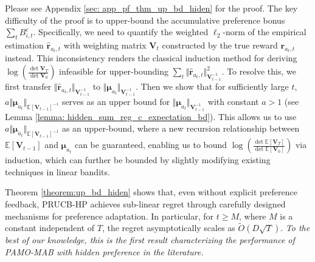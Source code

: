 Please see Appendix \ref{sec: app_pf_thm_up_bd_hiden} for the proof. The key difficulty of the proof is to upper-bound the accumulative preference bonus $\sum_{t}B_{i,t}^{c}$. Specifically, we need to quantify the weighted $\ell_2$-norm of the empirical estimation $\boldsymbol{\hat{r}}_{a_t,t}$ with weighting matrix $\boldsymbol{V}_{t}$ constructed by the true reward $\boldsymbol{r}_{a_t,t}$ instead. 
This inconsistency renders the classical induction method \cite{abbasi2011improved} for deriving $\log (\frac{\det \boldsymbol{V}_{T}}{\det \boldsymbol{V}_{0}})$ infeasible for upper-bounding $\sum_{t} \Vert \boldsymbol{\hat{r}}_{a_t,t} \Vert_{\boldsymbol{V}_{t-1}^{-1}}^2$. 
To resolve this, we first transfer $\Vert \boldsymbol{\hat{r}}_{a_t,t} \Vert_{\boldsymbol{V}_{t-1}^{-1}}$ to $\Vert \boldsymbol{\mu}_{a_t} \Vert_{\boldsymbol{V}_{t-1}^{-1}}$. Then we show that for sufficiently large $t$, $a \Vert \boldsymbol{\mu}_{a_t} \Vert_{\mathbb{E}[\boldsymbol{V}_{t-1}]^{-1}}$ serves as an upper bound for $\Vert \boldsymbol{\mu}_{a_t} \Vert_{\boldsymbol{V}_{t-1}^{-1}}$ with constant $a > 1$ (see Lemma \ref{lemma: hidden_sum_reg_c_expectation_bd}).
This allows us to use $a \Vert \boldsymbol{\mu}_{a_t} \Vert_{\mathbb{E}[\boldsymbol{V}_{t-1}]^{-1}}$ as an upper-bound, where a new recursion relationship between $\mathbb{E}[\boldsymbol{V}_{t-1}]$ and $\boldsymbol{\mu}_{a_t}$ can be guaranteed, enabling us to bound $\log (\frac{\det \mathbb{E}[\boldsymbol{V}_{T}]}{\det \mathbb{E}[\boldsymbol{V}_{0}]})$ via induction, which can further be bounded by slightly modifying existing techniques in linear bandits.

\begin{remark}
Theorem \ref{theorem:up_bd_hiden} shows that, even without explicit preference feedback, PRUCB-HP achieves sub-linear regret through carefully designed mechanisms for preference adaptation.
In particular, for $t \geq M$, where $M$ is a constant independent of $T$, the regret asymptotically scales as $\tilde{O} ( D \sqrt{T} )$.
\emph{To the best of our knowledge, this is the first result characterizing the performance of PAMO-MAB with hidden preference in the literature.}
\end{remark}




